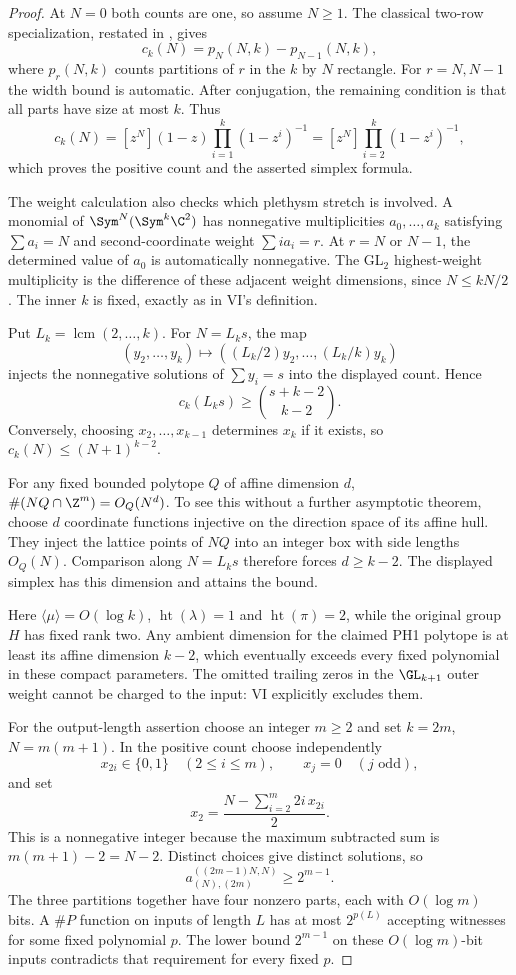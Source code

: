\begin{proof}
At $N=0$ both counts are one, so assume $N\ge1$.
The classical two-row specialization, restated in
\cite[Lemma~1.3, p.~2]{PPS}, gives
\[
 c_k(N)=p_N(N,k)-p_{N-1}(N,k),
\]
where $p_r(N,k)$ counts partitions of $r$ in the $k$ by $N$ rectangle.
For $r=N,N-1$ the width bound is automatic. After conjugation, the
remaining condition is that all parts have size at most $k$. Thus
\[
 c_k(N)
 =[z^N](1-z)\prod_{i=1}^k(1-z^i)^{-1}
 =[z^N]\prod_{i=2}^k(1-z^i)^{-1},
\]
which proves the positive count and the asserted simplex formula.

The weight calculation also checks which plethysm stretch is involved.
A monomial of $\Sym^N(\Sym^k\C^2)$ has nonnegative multiplicities
$a_0,\ldots,a_k$ satisfying $\sum a_i=N$ and second-coordinate weight
$\sum ia_i=r$. At $r=N$ or $N-1$, the determined value of $a_0$ is
automatically nonnegative. The GL$_2$ highest-weight multiplicity is
the difference of these adjacent weight dimensions, since
$N\le kN/2$. The inner $k$ is fixed, exactly as in VI's definition.

Put $L_k=\operatorname{lcm}(2,\ldots,k)$. For $N=L_ks$, the map
\[
 (y_2,\ldots,y_k)\longmapsto
       ((L_k/2)y_2,\ldots,(L_k/k)y_k)
\]
injects the nonnegative solutions of $\sum y_i=s$ into the displayed
count. Hence
\[
 c_k(L_ks)\ge\binom{s+k-2}{k-2}.
\]
Conversely, choosing $x_2,\ldots,x_{k-1}$ determines $x_k$ if it
exists, so $c_k(N)\le(N+1)^{k-2}$.

For any fixed bounded polytope $Q$ of affine dimension $d$,
$\#(NQ\cap\Z^m)=O_Q(N^d)$. To see this without a further asymptotic
theorem, choose $d$ coordinate functions injective on the direction
space of its affine hull. They inject the lattice points of $NQ$
into an integer box with side lengths $O_Q(N)$.
Comparison along $N=L_ks$ therefore forces $d\ge k-2$.
The displayed simplex has this dimension and attains the bound.

Here $\langle\mu\rangle=O(\log k)$,
$\operatorname{ht}(\lambda)=1$ and
$\operatorname{ht}(\pi)=2$, while the original group $H$ has fixed
rank two. Any ambient dimension for the claimed PH1 polytope is at
least its affine dimension $k-2$, which eventually exceeds every
fixed polynomial in these compact parameters. The omitted trailing
zeros in the $\GL_{k+1}$ outer weight cannot be charged to the input:
VI explicitly excludes them.

For the output-length assertion choose an integer $m\ge2$ and set
$k=2m$, $N=m(m+1)$. In the positive count choose independently
\[
 x_{2i}\in\{0,1\}\quad(2\le i\le m),\qquad
 x_j=0\quad(j\text{ odd}),
\]
and set
\[
 x_2=\frac{N-\sum_{i=2}^m2i\,x_{2i}}2.
\]
This is a nonnegative integer because the maximum subtracted sum
is $m(m+1)-2=N-2$. Distinct choices give distinct solutions, so
\[
 a^{((2m-1)N,N)}_{(N),(2m)}\ge2^{m-1}.
\]
The three partitions together have four nonzero parts, each with
$O(\log m)$ bits. A $\#P$ function on inputs of length $L$ has at
most $2^{p(L)}$ accepting witnesses for some fixed polynomial $p$.
The lower bound $2^{m-1}$ on these $O(\log m)$-bit inputs contradicts
that requirement for every fixed $p$.
\end{proof}

